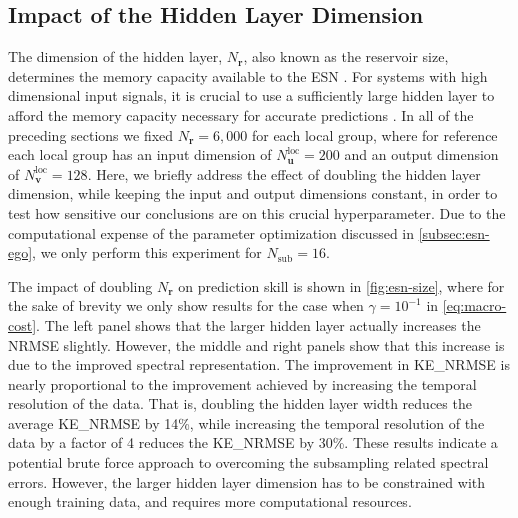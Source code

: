 \documentclass[draft]{agujournal2019}
\newcommand{\state}{\mathbf{v}}
\newcommand{\hidden}{\mathbf{r}}
\newcommand{\inputstate}{\mathbf{u}}
\newcommand{\nstate}{N_{\state}}
\newcommand{\nhidden}{N_{\hidden}}
\newcommand{\ninputstate}{N_{\inputstate}}
\newcommand{\nlocalstate}{\nstate^\text{loc}}
\newcommand{\nlocalinputstate}{\ninputstate^\text{loc}}
\newcommand{\nsub}{N_\text{sub}}
\newcommand{\citep}{\cite}
\begin{document}
\subsection{Impact of the Hidden Layer Dimension}
\label{subsec:esn-size}

The dimension of the hidden layer, $\nhidden$, also known as the reservoir size, determines the
memory capacity available to the ESN
\citep{jaeger_echo_2001,lukosevicius_practical_2012}.
For systems with high dimensional input signals, it is crucial to use a sufficiently large hidden layer to afford the memory capacity necessary for accurate
predictions \citep{hermans_memory_2010}.
In all of the preceding sections we fixed $\nhidden=6,000$ for each local group,
where for reference each local group has an input dimension of
$\nlocalinputstate=200$ and an output dimension of $\nlocalstate=128$.
Here, we briefly address the effect of doubling the hidden layer dimension, while keeping the input and output dimensions constant, in order to test how
sensitive our conclusions are on this crucial hyperparameter.
Due to the computational expense of the parameter optimization discussed in
\cref{subsec:esn-ego}, we only perform this experiment for $\nsub=16$.

The impact of doubling $\nhidden$ on prediction skill is shown in
\cref{fig:esn-size}, where for the sake of brevity we only show results for the
case when $\gamma=10^{-1}$ in \cref{eq:macro-cost}.
The left panel shows that the larger hidden layer actually increases the NRMSE slightly.
However, the middle and right panels show that this increase is due to the improved
spectral representation.
The improvement in KE\_NRMSE is nearly proportional to the improvement achieved by increasing
the temporal resolution of the data.
That is, doubling the hidden layer width reduces the average KE\_NRMSE by 14\%,
while increasing the temporal resolution of the data by a factor of 4 reduces
the KE\_NRMSE by 30\%.
These results indicate a potential brute force approach to overcoming the
subsampling related spectral errors.
However, the larger hidden layer dimension has to be constrained
with enough training data, and requires more
computational resources.
\end{document}

